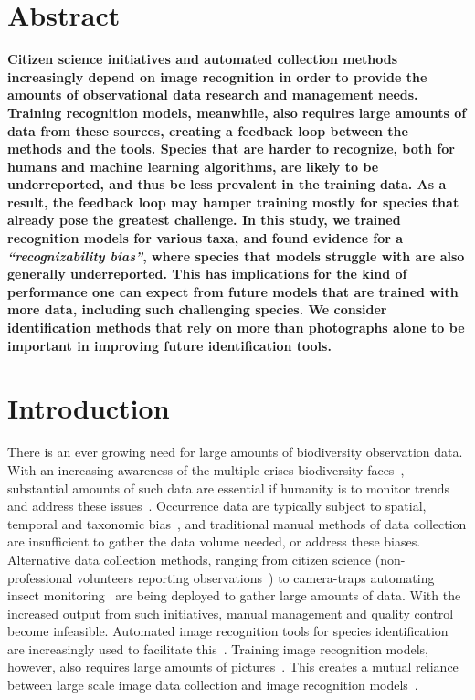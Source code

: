 \documentclass{article}
\begin{document}
\section*{Abstract}
\textbf{
  Citizen science initiatives and automated collection methods increasingly depend on image recognition in order to provide the amounts of observational data research and management needs. Training recognition models, meanwhile, also requires large amounts of data from these sources, creating a feedback loop between the methods and the tools. Species that are harder to recognize, both for humans and machine learning algorithms, are likely to be underreported, and thus be less prevalent in the training data. As a result, the feedback loop may hamper training mostly for species that already pose the greatest challenge. In this study, we trained recognition models for various taxa, and found evidence for a \textit{``recognizability bias''}, where species that models struggle with are also generally underreported. This has implications for the kind of performance one can expect from future models that are trained with more data, including such challenging species. We consider identification methods that rely on more than photographs alone to be important in improving future identification tools.
}

\section*{Introduction}
There is an ever growing need for large amounts of biodiversity observation data. With an increasing awareness of the multiple crises biodiversity faces~\cite{IPBES,IPCC,CBD}, substantial amounts of such data are essential if humanity is to monitor trends and address these issues~\cite{Xu2021,Wetzel2018,Scholes2008}. Occurrence data are typically subject to spatial, temporal and taxonomic bias~\cite{Boakes2010,Troudet2017}, and traditional manual methods of data collection are insufficient to gather the data volume needed, or address these biases. Alternative data collection methods, ranging from citizen science (non-professional volunteers reporting observations~\cite{Silvertown2009}) to camera-traps automating insect monitoring~\cite{Hansen2019,Kirkeby2021} are being deployed to gather large amounts of data. With the increased output from such initiatives, manual management and quality control become infeasible. Automated image recognition tools for species identification are increasingly used to facilitate this~\cite{Christin2019,Weinstein2017,Wldchen2018,Ceccaroni2019}. Training image recognition models, however, also requires large amounts of pictures~\cite{Goodfellow}. This creates a mutual reliance between large scale image data collection and image recognition models~\cite{Lotfian2021}.
\end{document}
